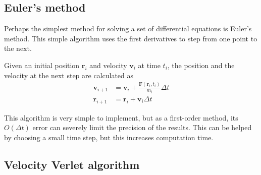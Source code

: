 \documentclass[aps,prc,reprint,nobalancelastpage]{revtex4-1}
\begin{document}
    \subsection{Euler's method}
    \label{sub:euler}

        Perhaps the simplest method for solving a set of differential equations is Euler's method. This simple algorithm uses the first derivatives to step from one point to the next.

        Given an initial position $\mathbf{r}_i$ and velocity $\mathbf{v}_i$ at time $t_i$, the position and the velocity at the next step are calculated as
        \begin{align}
            \mathbf{v}_{i+1} &= \mathbf{v}_i + \frac{\mathbf{F}(\mathbf{r}_i, t_i)}{m_i} \Delta t \\
            \mathbf{r}_{i+1} &= \mathbf{r}_i + \mathbf{v}_i \Delta t
        \end{align}

        This algorithm is very simple to implement, but as a first-order method, its $O(\Delta t)$ error can severely limit the precision of the results. This can be helped by choosing a small time step, but this increases computation time.

    \subsection{Velocity Verlet algorithm}
    \label{sub:verlet}
\end{document}
